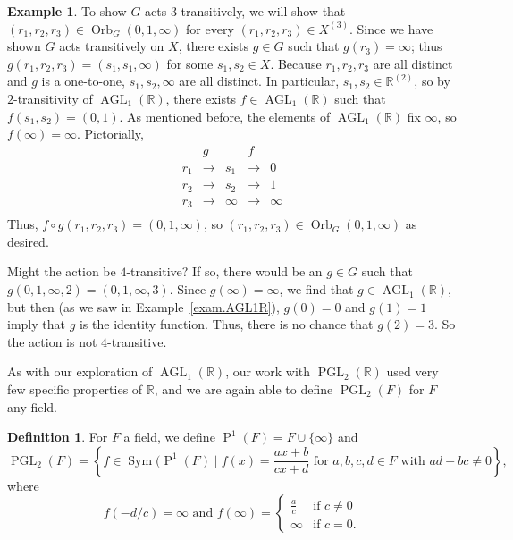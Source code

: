 \documentclass[11pt]{amsart}
\theoremstyle{plain}
\theoremstyle{definition}
\newtheorem*{definition*}{Definition}
\newtheorem{example}{Example}
\theoremstyle{remark}
\DeclareMathOperator{\Sym}{Sym}
\DeclareMathOperator{\AGL}{AGL}
\DeclareMathOperator{\PGL}{PGL}
\DeclareMathOperator{\Proj}{P}
\DeclareMathOperator{\Orb}{Orb}
\begin{document}
\begin{example}
To show $G$ acts $3$-transitively, we will show that $(r_1,r_2,r_3)\in \Orb_G(0,1,\infty)$ for every $(r_1,r_2,r_3)\in X^{(3)}$. Since we have shown $G$ acts transitively on $X$, there exists $g\in G$ such that $g(r_3) = \infty$; thus $g(r_1,r_2,r_3) = (s_1,s_1,\infty)$ for some $s_1,s_2\in X$.  Because $r_1,r_2,r_3$ are all distinct and $g$ is a one-to-one, $s_1,s_2,\infty$ are all distinct. In particular, $s_1,s_2 \in \mathbb{R}^{(2)}$, so by $2$-transitivity of $\AGL_1(\mathbb{R})$, there exists $f\in \AGL_1(\mathbb{R})$ such that $f(s_1,s_2) = (0,1)$. As mentioned before, the elements of $\AGL_1(\mathbb{R})$ fix $\infty$, so $f(\infty) = \infty$. Pictorially,
\[\begin{array}{ccccc}
    & g           &        & f           & \\
r_1 & \rightarrow & s_1   & \rightarrow & 0\\
r_2 & \rightarrow & s_2   & \rightarrow & 1\\
r_3 & \rightarrow & \infty & \rightarrow & \infty\\
\end{array}\]
Thus, $f\circ g(r_1,r_2,r_3) = (0,1,\infty)$, so $(r_1,r_2,r_3)\in \Orb_G(0,1,\infty)$ as desired.

Might the action be $4$-transitive? If so, there would be an $g\in G$ such that $g (0,1,\infty,2) = (0,1,\infty,3)$. Since $g(\infty) = \infty$, we find that $g\in \AGL_1(\mathbb{R})$, but then (as we saw in Example~\ref{exam.AGL1R}), $g(0) = 0$ and $g(1) = 1$ imply that $g$ is the identity function. Thus, there is no chance that $g(2) = 3$. So the action is not $4$-transitive.
\end{example}

As with our exploration of $\AGL_1(\mathbb{R})$, our work with $\PGL_2(\mathbb{R})$ used very few specific properties of $\mathbb{R}$, and we are again able to define $\PGL_2(F)$ for $F$ any field.

\begin{definition*}
For $F$ a field, we define $\Proj^1(F) = F \cup \{\infty\}$ and \[\PGL_2(F) = \left\{ f \in \Sym(\Proj^1(F) \mid \text{$f(x) = \frac{ax+b}{cx+d}$ for $a,b,c,d\in F$ with $ad-bc\neq 0$}\right\},\]
where
\[f(-d/c) = \infty \text{ and } f(\infty) = \begin{cases} \frac{a}{c} &  \text{if $c\neq 0$}\\ \infty &  \text{if $c= 0$}.\end{cases}\]
\end{definition*}
\end{document}
